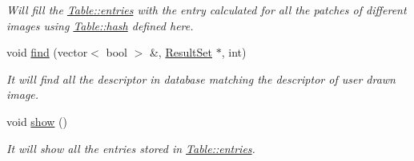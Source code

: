 \begin{DoxyCompactItemize}
\begin{DoxyCompactList}\small\item\em \-Will fill the \hyperlink{classTable_aff08f646763f9b621ab9cf5678e40227}{\-Table\-::entries} with the entry calculated for all the patches of different images using \hyperlink{classTable_a0d776f9c99a00daa15a1cda6fd186592}{\-Table\-::hash} defined here. \end{DoxyCompactList}\item 
void \hyperlink{classTable_a84f84ff9071a6636e2150431eb4c19b1}{find} (vector$<$ bool $>$ \&, \hyperlink{classResultSet}{\-Result\-Set} $\ast$, int)
\begin{DoxyCompactList}\small\item\em \-It will find all the descriptor in database matching the descriptor of user drawn image. \end{DoxyCompactList}\item 
\hypertarget{classTable_a2698f5ada6c37ef2245e4a5e8161ae5e}{void \hyperlink{classTable_a2698f5ada6c37ef2245e4a5e8161ae5e}{show} ()}\label{classTable_a2698f5ada6c37ef2245e4a5e8161ae5e}

\begin{DoxyCompactList}\small\item\em \-It will show all the entries stored in \hyperlink{classTable_aff08f646763f9b621ab9cf5678e40227}{\-Table\-::entries}. \end{DoxyCompactList}\end{DoxyCompactItemize}
